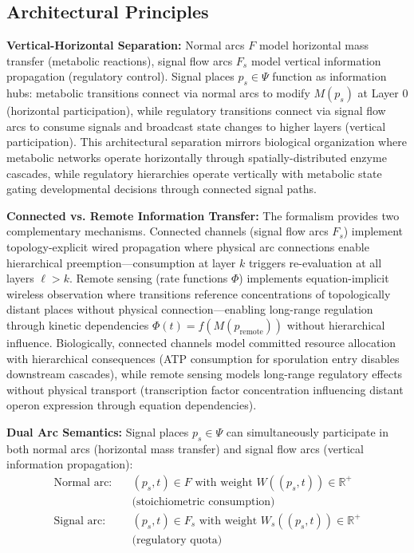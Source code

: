 \documentclass[10pt,letterpaper]{article}
\begin{document}
\subsection{Architectural Principles}

\textbf{Vertical-Horizontal Separation:} Normal arcs $F$ model horizontal mass transfer (metabolic reactions), signal flow arcs $F_s$ model vertical information propagation (regulatory control). Signal places $p_s \in \Psi$ function as information hubs: metabolic transitions connect via normal arcs to modify $M(p_s)$ at Layer 0 (horizontal participation), while regulatory transitions connect via signal flow arcs to consume signals and broadcast state changes to higher layers (vertical participation). This architectural separation mirrors biological organization where metabolic networks operate horizontally through spatially-distributed enzyme cascades, while regulatory hierarchies operate vertically with metabolic state gating developmental decisions through connected signal paths.

\textbf{Connected vs. Remote Information Transfer:} The formalism provides two complementary mechanisms. Connected channels (signal flow arcs $F_s$) implement topology-explicit wired propagation where physical arc connections enable hierarchical preemption---consumption at layer $k$ triggers re-evaluation at all layers $\ell > k$. Remote sensing (rate functions $\Phi$) implements equation-implicit wireless observation where transitions reference concentrations of topologically distant places without physical connection---enabling long-range regulation through kinetic dependencies $\Phi(t) = f(M(p_{\text{remote}}))$ without hierarchical influence. Biologically, connected channels model committed resource allocation with hierarchical consequences (ATP consumption for sporulation entry disables downstream cascades), while remote sensing models long-range regulatory effects without physical transport (transcription factor concentration influencing distant operon expression through equation dependencies).

\textbf{Dual Arc Semantics:} Signal places $p_s \in \Psi$ can simultaneously participate in both normal arcs (horizontal mass transfer) and signal flow arcs (vertical information propagation):
\begin{align}
\text{Normal arc}: &\quad (p_s, t) \in F \text{ with weight } W((p_s,t)) \in \mathbb{R}^+ \nonumber \\
&\quad \text{(stoichiometric consumption)} \\
\text{Signal arc}: &\quad (p_s, t) \in F_s \text{ with weight } W_s((p_s,t)) \in \mathbb{R}^+ \nonumber \\
&\quad \text{(regulatory quota)}
\end{align}
\end{document}
